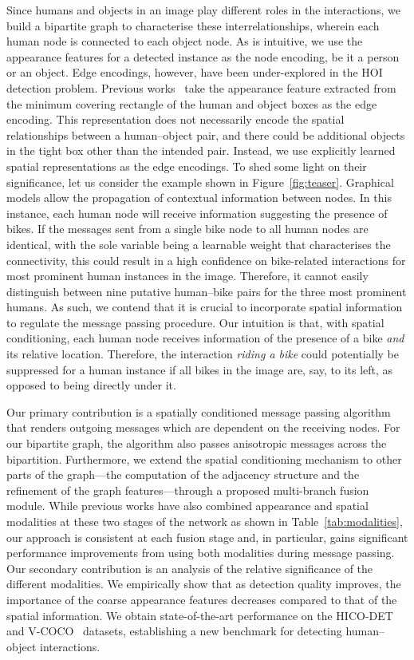 \documentclass[10pt,twocolumn,letterpaper]{article}
\begin{document}
Since humans and objects in an image play different roles in the interactions, we build a bipartite graph to characterise these interrelationships, wherein each human node is connected to each object node. As is intuitive, we use the appearance features for a detected instance as the node encoding, be it a person or an object. Edge encodings, however, have been under-explored in the HOI detection problem. Previous works~\cite{qi2018,wang2020} take the appearance feature extracted from the minimum covering rectangle of the human and object boxes as the edge encoding. This representation does not necessarily encode the spatial relationships between a human--object pair, and there could be additional objects in the tight box other than the intended pair. Instead, we use explicitly learned spatial representations as the edge encodings. To shed some light on their significance, let us consider the example shown in Figure~\ref{fig:teaser}. Graphical models allow the propagation of contextual information between nodes. In this instance, each human node will receive information suggesting the presence of bikes. If the messages sent from a single bike node to all human nodes are identical, with the sole variable being a learnable weight that characterises the connectivity, this could result in a high confidence on bike-related interactions for most prominent human instances in the image. Therefore, it cannot easily distinguish between nine putative human--bike pairs for the three most prominent humans. As such, we contend that it is crucial to incorporate spatial information to regulate the message passing procedure.
Our intuition is that, with spatial conditioning, each human node receives information of the presence of a bike \textit{and} its relative location. Therefore, the interaction \textit{riding a bike} could potentially be suppressed for a human instance if all bikes in the image are, say, to its left, as opposed to being directly under it.

Our primary contribution is a spatially conditioned message passing algorithm that renders outgoing messages which are dependent on the receiving nodes. For our bipartite graph, the algorithm also passes anisotropic messages across the bipartition. Furthermore, we extend the spatial conditioning mechanism to other parts of the graph---the computation of the adjacency structure and the refinement of the graph features---through a proposed multi-branch fusion module. While previous works have also combined appearance and spatial modalities at these two stages of the network as shown in Table~\ref{tab:modalities}, our approach is consistent at each fusion stage and, in particular, gains significant performance improvements from using both modalities during message passing.
Our secondary contribution is an analysis of the relative significance of the different modalities. We empirically show that as detection quality improves, the importance of the coarse appearance features decreases compared to that of the spatial information. We obtain state-of-the-art performance on the HICO-DET~\cite{chao2018} and V-COCO~\cite{gupta2015} datasets, establishing a new benchmark for detecting human--object interactions.
\end{document}
